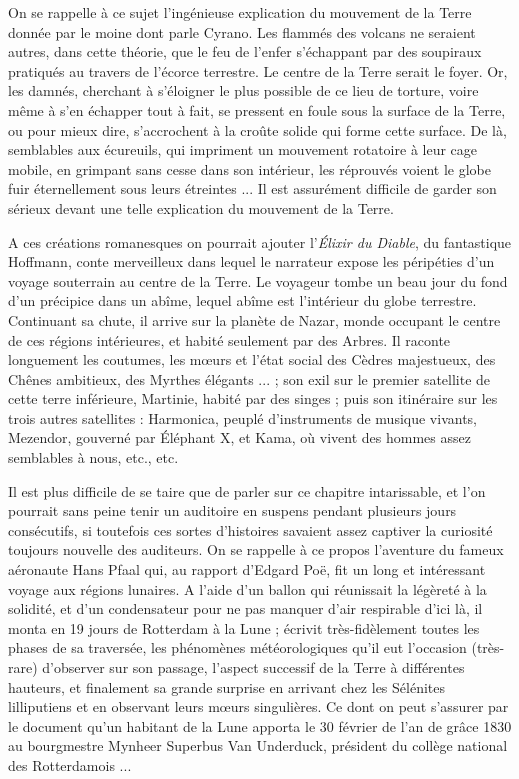 \documentclass[a4paper, 11pt, oneside]{article}
\begin{document}
On se rappelle à ce sujet l'ingénieuse explication du mouvement de la Terre donnée par le moine dont parle Cyrano. Les flammés des volcans ne seraient autres, dans cette théorie, que le feu de l'enfer s'échappant par des soupiraux pratiqués au travers de l'écorce terrestre. Le centre de la Terre serait le foyer. Or, les damnés, cherchant à s'éloigner le plus possible de ce lieu de torture, voire même à s'en échapper tout à fait, se pressent en foule sous la surface de la Terre, ou pour mieux dire, s'accrochent à la croûte solide qui forme cette surface. De là, semblables aux écureuils, qui impriment un mouvement rotatoire à leur cage mobile, en grimpant sans cesse dans son intérieur, les réprouvés voient le globe fuir éternellement sous leurs étreintes ... Il est assurément difficile de garder son sérieux devant une telle explication du mouvement de la Terre.

A ces créations romanesques on pourrait ajouter l'\emph{Élixir du Diable}, du fantastique Hoffmann, conte merveilleux dans lequel le narrateur expose les péripéties d'un voyage souterrain au centre de la Terre. Le voyageur tombe un beau jour du fond d'un précipice dans un abîme, lequel abîme est l'intérieur du globe terrestre. Continuant sa chute, il arrive sur la planète de Nazar, monde occupant le centre de ces régions intérieures, et habité seulement par des Arbres. Il raconte longuement les coutumes, les mœurs et l'état social des Cèdres majestueux, des Chênes ambitieux, des Myrthes élégants ... ; son exil sur le premier satellite de cette terre inférieure, Martinie, habité par des singes ; puis son itinéraire sur les trois autres satellites : Harmonica, peuplé d'instruments de musique vivants, Mezendor, gouverné par Éléphant X, et Kama, où vivent des hommes assez semblables à nous, etc., etc.

Il est plus difficile de se taire que de parler sur ce chapitre intarissable, et l'on pourrait sans peine tenir un auditoire en suspens pendant plusieurs jours consécutifs, si toutefois ces sortes d'histoires savaient assez captiver la curiosité toujours nouvelle des auditeurs. On se rappelle à ce propos l'aventure du fameux aéronaute Hans Pfaal qui, au rapport d'Edgard Poë, fit un long et intéressant voyage aux régions lunaires. A l'aide d'un ballon qui réunissait la légèreté à la solidité, et d'un condensateur pour ne pas manquer d'air respirable d'ici là, il monta en 19 jours de Rotterdam à la Lune ; écrivit très-fidèlement toutes les phases de sa traversée, les phénomènes météorologiques qu'il eut l'occasion (très-rare) d'observer sur son passage, l'aspect successif de la Terre à différentes hauteurs, et finalement sa grande surprise en arrivant chez les Sélénites lilliputiens et en observant leurs mœurs singulières. Ce dont on peut s'assurer par le document qu'un habitant de la Lune apporta le 30 février de l'an de grâce 1830 au bourgmestre Mynheer Superbus Van Underduck, président du collège national des Rotterdamois ...
\end{document}
